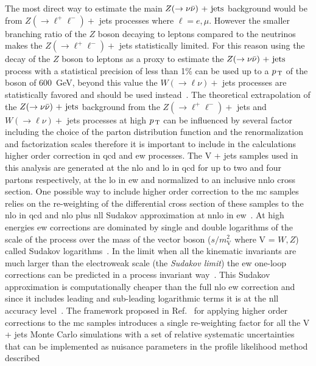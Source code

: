 The most direct way to estimate the main $Z (\rightarrow \nu \bar{\nu})\mathrm{~+~jets}$ background would be
from $Z (\rightarrow \ell^+ \ell^-) +$ jets processes where $\ell = e, \mu$.
However the smaller branching ratio of the $Z$ boson decaying to leptons
compared to the neutrinos makes the $Z (\rightarrow \ell^+ \ell^-) +$ jets
statistically limited. For this reason using the decay of the $Z$ boson to
leptons as a proxy to estimate the $Z (\rightarrow \nu \bar{\nu})\mathrm{~+~jets}$ process with a statistical
precision of less than 1\% can be used up to a $p_\mathrm{\, T}$ of the boson of 600~GeV,
beyond this value the $W(\rightarrow \ell \nu) +$ jets processes are
statistically favored and should be used
instead~\cite{VplusJetsCorrections}. The theoretical extrapolation of the
$Z (\rightarrow \nu \bar{\nu})\mathrm{~+~jets}$ background from the $Z (\rightarrow \ell^+ \ell^-) +$ jets and
$W(\rightarrow \ell \nu) +$ jets processes at high $p_\mathrm{\, T}$ can be influenced by
several factor including the choice of the parton distribution function and the
renormalization and factorization scales therefore it is important to include in
the calculations higher order correction in \gls{qcd} and \gls{ew}
processes. The V + jets samples used in this analysis are generated at the
\gls{nlo} and \gls{lo} in \gls{qcd} for up to two and four partons respectively,
at the \gls{lo} in \gls{ew} and normalized to an inclusive \gls{nnlo} cross
section. One possible way to include higher order correction to the \gls{mc}
samples relies on the re-weighting of the differential cross section of these
samples to the \gls{nlo} in \gls{qcd} and \gls{nlo} plus \gls{nll} Sudakov
approximation at \gls{nnlo} in \gls{ew}~\cite{VplusJetsCorrections}. At high
energies \gls{ew} corrections are dominated by single and double logarithms of
the scale of the process over the mass of the vector boson ($s/m_\mathrm{V}^2$
where V = $W, Z$) called Sudakov logarithms~\cite{SudakovLogs}. In the limit
when all the kinematic invariants are much larger than the electroweak scale
(the \emph{Sudakov limit}) the \gls{ew} one-loop corrections can be predicted in
a process invariant way~\cite{SudakovApproximation}. This Sudakov approximation
is computationally cheaper than the full \gls{nlo} \gls{ew} correction and since
it includes leading and sub-leading logarithmic terms it is at the \gls{nll}
accuracy level~\cite{SudakovApproximation}. The framework proposed in
Ref.~\cite{VplusJetsCorrections} for applying higher order corrections to the
\gls{mc} samples introduces a single re-weighting factor for all the V + jets
Monte Carlo simulations with a set of relative systematic uncertainties that can
be implemented as nuisance parameters in the profile likelihood method described
